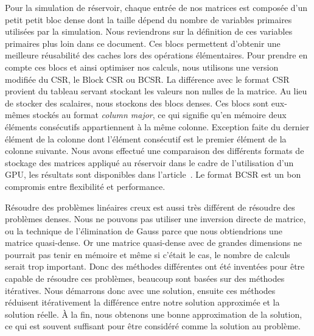 Pour la simulation de réservoir, chaque entrée de nos matrices est composée d'un petit petit bloc dense dont la taille dépend du nombre de variables primaires utilisées par la simulation.
%
Nous reviendrons sur la définition de ces variables primaires plus loin dans ce document.
%
Ces blocs permettent d'obtenir une meilleure réusabilité des caches lors des opérations élémentaires.
%
Pour prendre en compte ces blocs et ainsi optimiser nos calculs, nous utilisons une version modifiée du CSR, le Block CSR ou BCSR.
%
La différence avec le format CSR provient du tableau servant stockant les valeurs non nulles de la matrice.
%
Au lieu de stocker des scalaires, nous stockons des blocs denses.
%
Ces blocs sont eux-mêmes stockés au format {\em column major}, ce qui signifie qu'en mémoire deux éléments consécutifs appartiennent à la même colonne.
%
Exception faite du dernier élément de la colonne dont l'élément consécutif est le premier élément de la colonne suivante.
%
Nous avons effectué une comparaison des différents formats de stockage des matrices appliqué au réservoir dans le cadre de l'utilisation d'un GPU, les résultats sont disponibles dans l'article~\cite{Renpar}.
%
Le format BCSR est un bon compromis entre flexibilité et performance.

Résoudre des problèmes linéaires creux est aussi très différent de résoudre des problèmes denses.
%
Nous ne pouvons pas utiliser une inversion directe de matrice, ou la technique de l'élimination de Gauss parce que nous obtiendrions une matrice quasi-dense.
%
Or une matrice quasi-dense avec de grandes dimensions ne pourrait pas tenir en mémoire et même si c'était le cas, le nombre de calculs serait trop important.
%
Donc des méthodes différentes ont été inventées pour être capable de résoudre ces problèmes, beaucoup sont basées sur des méthodes itératives.
%
Nous démarrons donc avec une solution, ensuite ces méthodes réduisent itérativement la différence entre notre solution approximée et la solution réelle.
%
\`{A} la fin, nous obtenons une bonne approximation de la solution, ce qui est souvent suffisant pour être considéré comme la solution au problème.
